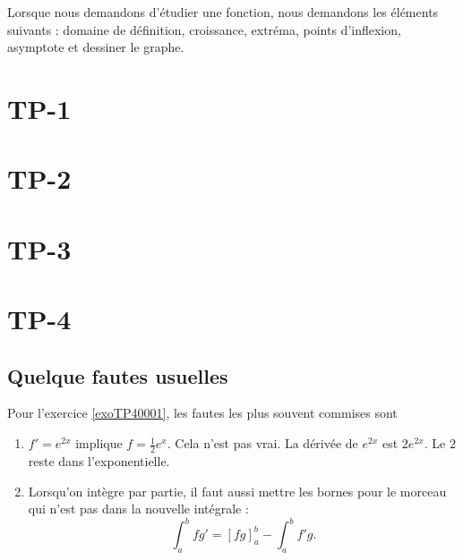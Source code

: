 Lorsque nous demandons d'étudier une fonction, nous demandons les éléments suivants : domaine de définition, croissance, extréma, points d'inflexion, asymptote et dessiner le graphe.

\renewcommand{\theexercice}{TP\arabic{section}.\arabic{exercice}}

\section{TP-1}
\section{TP-2}
\section{TP-3}
\setcounter{exercice}{0}





\section{TP-4}
\setcounter{exercice}{0}



\subsection{Quelque fautes usuelles}

Pour l'exercice \ref{exoTP40001}, les fautes les plus souvent commises sont
\begin{enumerate}

	\item
		$f'= e^{2x}$ implique $f=\frac{1}{ 2 } e^{x}$. Cela n'est pas vrai. La dérivée de $ e^{2x}$ est $2 e^{2x}$. Le $2$ reste dans l'exponentielle.

	\item
		Lorsqu'on intègre par partie, il faut aussi mettre les bornes pour le morceau qui n'est pas dans la nouvelle intégrale :
		\begin{equation}
			\int_a^b fg'=[fg]_a^b-\int_a^bf'g.
		\end{equation}
\end{enumerate}

